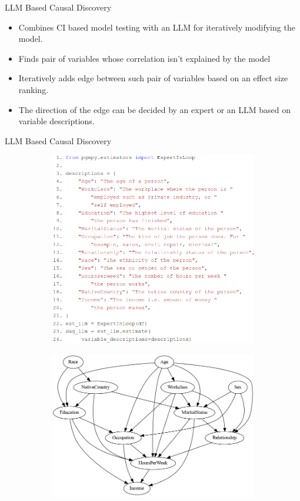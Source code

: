 \documentclass{beamer}
\begin{document}
\begin{frame}{LLM Based Causal Discovery}
	\begin{itemize}
		\item Combines CI based model testing with an LLM for iteratively modifying the model.
		\item Finds pair of variables whose correlation isn't explained by the model
		\item Iteratively adds edge between such pair of variables based on an effect size ranking.
		\item The direction of the edge can be decided by an expert or an LLM based on variable descriptions.
	\end{itemize}
\end{frame}
\begin{frame}{LLM Based Causal Discovery}
	\begin{figure}
		\begin{subfigure}{0.55 \textwidth}
			\centering
			\includegraphics[scale=0.23]{imgs/dag_llm.png}
		\end{subfigure}%
		\begin{subfigure}{0.45 \textwidth}
			\centering
			\includegraphics[scale=0.23]{imgs/adult_llm.png}

\end{subfigure}
\end{figure}
\end{frame}
\end{document}
